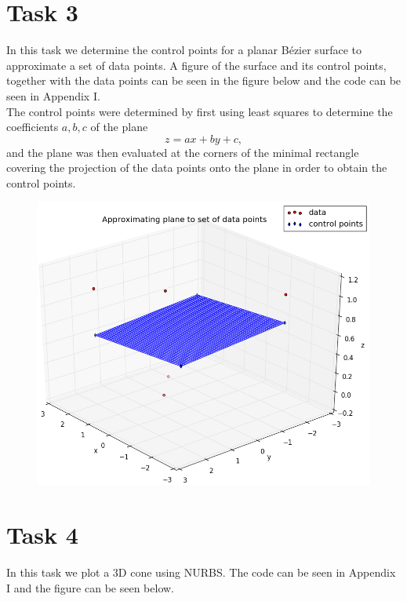 \documentclass[]{article}
\begin{document}
\section*{Task 3}
In this task we determine the control points for a planar B\'{e}zier surface to approximate a set of data points. A figure of the surface and its control points, together with the data points can be seen in the figure below and the code can be seen in Appendix I.\\
The control points were determined by first using least squares to determine the coefficients $a, b, c$ of the plane
\begin{equation*}
z = ax + by + c,
\end{equation*}
and the plane was then evaluated at the corners of the minimal rectangle covering the projection of the data points onto the plane in order to obtain the control points.
\begin{figure}[h!]
	\includegraphics[scale=0.4]{plane}
\end{figure}
\section*{Task 4}
In this task we plot a 3D cone using NURBS. The code can be seen in Appendix I and the figure can be seen below.\\
\end{document}

